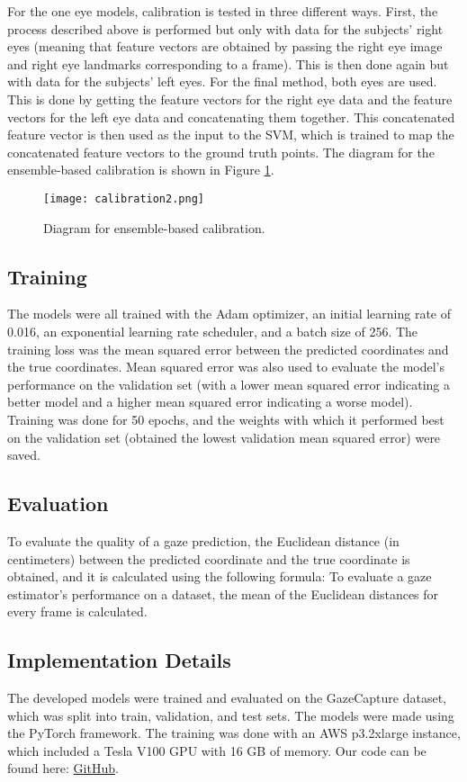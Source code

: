 \documentclass{article}
\begin{document}
For the one eye models, calibration is tested in three different ways. First, the process described above is performed but only with data for the subjects' right eyes (meaning that feature vectors are obtained by passing the right eye image and right eye landmarks corresponding to a frame). This is then done again but with data for the subjects' left eyes. For the final method, both eyes are used. This is done by getting the feature vectors for the right eye data and the feature vectors for the left eye data and concatenating them together. This concatenated feature vector is then used as the input to the SVM, which is trained to map the concatenated feature vectors to the ground truth points. The diagram for the ensemble-based calibration is shown in Figure \ref{fig:calibration}.

\begin{figure}
  \texttt{[image: calibration2.png]}
  \caption{Diagram for ensemble-based calibration.}
  \label{fig:calibration}
\end{figure}

\subsection{Training}
The models were all trained with the Adam optimizer, an initial learning rate of 0.016, an exponential learning rate scheduler, and a batch size of 256. The training loss was the mean squared error between the predicted coordinates and the true coordinates. Mean squared error was also used to evaluate the model's performance on the validation set (with a lower mean squared error indicating a better model and a higher mean squared error indicating a worse model). Training was done for 50 epochs, and the weights with which it performed best on the validation set (obtained the lowest validation mean squared error) were saved.

\subsection{Evaluation}
To evaluate the quality of a gaze prediction, the Euclidean distance (in centimeters) between the predicted coordinate  and the true coordinate  is obtained, and it is calculated using the following formula: 
To evaluate a gaze estimator's performance on a dataset, the mean of the Euclidean distances for every frame is calculated.

\subsection{Implementation Details}
\label{section:implementation}
The developed models were trained and evaluated on the GazeCapture dataset, which was split into train, validation, and test sets. The models were made using the PyTorch framework. The training was done with an AWS p3.2xlarge instance, which included a Tesla V100 GPU with 16 GB of memory. Our code can be found here: \href{https://github.com/rishipython/One-Eye-is-All-You-Need-Lightweight-Ensembles-for-Gaze-Estimation-with-Single-Encoders}{GitHub}.
\end{document}
